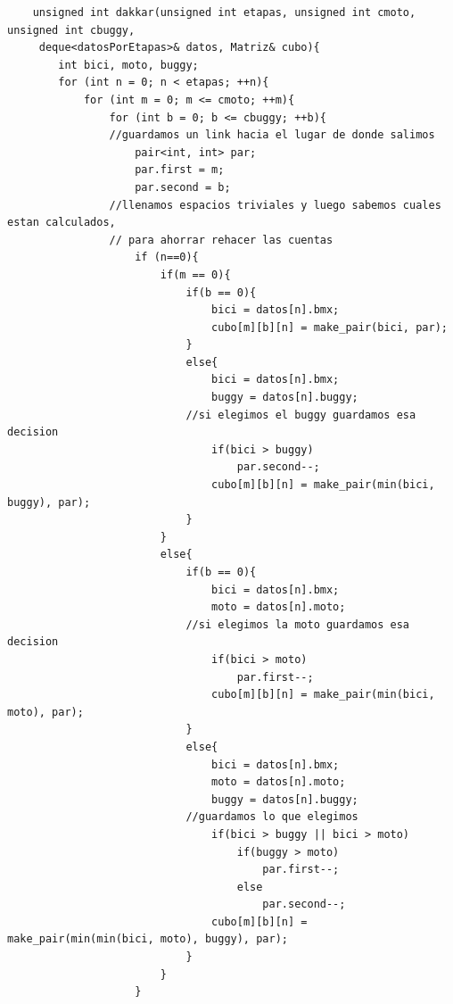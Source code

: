 	\begin{codesnippet}
	\begin{verbatim}
    unsigned int dakkar(unsigned int etapas, unsigned int cmoto, unsigned int cbuggy,
     deque<datosPorEtapas>& datos, Matriz& cubo){
        int bici, moto, buggy;
        for (int n = 0; n < etapas; ++n){
            for (int m = 0; m <= cmoto; ++m){
                for (int b = 0; b <= cbuggy; ++b){
                //guardamos un link hacia el lugar de donde salimos
                    pair<int, int> par;
                    par.first = m;
                    par.second = b;
                //llenamos espacios triviales y luego sabemos cuales estan calculados,
                // para ahorrar rehacer las cuentas
                    if (n==0){
                        if(m == 0){
                            if(b == 0){
                                bici = datos[n].bmx;
                                cubo[m][b][n] = make_pair(bici, par);
                            }
                            else{
                                bici = datos[n].bmx;
                                buggy = datos[n].buggy;
                            //si elegimos el buggy guardamos esa decision
                                if(bici > buggy)
                                    par.second--;
                                cubo[m][b][n] = make_pair(min(bici, buggy), par);
                            }
                        }
                        else{
                            if(b == 0){
                                bici = datos[n].bmx;
                                moto = datos[n].moto;
                            //si elegimos la moto guardamos esa decision
                                if(bici > moto)
                                    par.first--;
                                cubo[m][b][n] = make_pair(min(bici, moto), par);
                            }
                            else{
                                bici = datos[n].bmx;
                                moto = datos[n].moto;
                                buggy = datos[n].buggy;
                            //guardamos lo que elegimos
                                if(bici > buggy || bici > moto)
                                    if(buggy > moto)
                                        par.first--;
                                    else
                                        par.second--;
                                cubo[m][b][n] = make_pair(min(min(bici, moto), buggy), par);
                            }
                        }
                    }
	\end{verbatim}
	\end{codesnippet}

